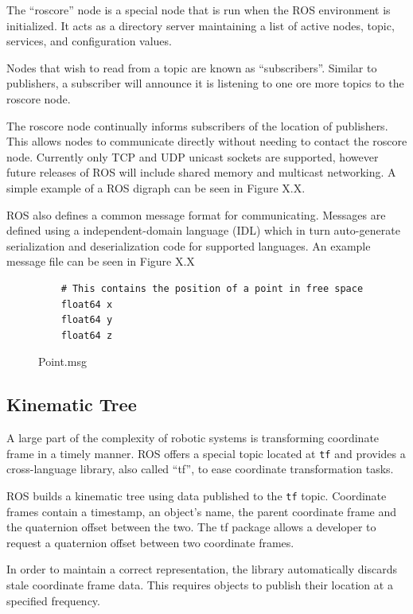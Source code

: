 The ``roscore'' node is a special node that is run when the ROS environment is initialized. It acts as a directory server maintaining a list of active nodes, topic, services, and configuration values.

Nodes that wish to read from a topic are known as ``subscribers''. Similar to publishers, a subscriber will announce it is listening to one ore more topics to the roscore node.

The roscore node continually informs subscribers of the location of publishers. This allows nodes to communicate directly without needing to contact the roscore node. Currently only TCP and UDP unicast sockets are supported, however future releases of ROS will include shared memory and multicast networking. A simple example of a ROS digraph can be seen in Figure X.X.

ROS also defines a common message format for communicating. Messages are defined using a independent-domain language (IDL) which in turn auto-generate serialization and deserialization code for supported languages. An example message file can be seen in Figure X.X

\begin{figure}[ht]
\makebox[\textwidth]{\hrulefill}
\begin{verbatim}
	# This contains the position of a point in free space
	float64 x
	float64 y
	float64 z
\end{verbatim}
\makebox[\textwidth]{\hrulefill}
\caption{Point.msg}
\end{figure}

\subsection{Kinematic Tree}
A large part of the complexity of robotic systems is transforming coordinate frame in a timely manner. ROS offers a special topic located at \verb!tf! and provides a cross-language library, also called ``tf'', to ease coordinate transformation tasks.

ROS builds a kinematic tree using data published to the \verb!tf! topic. Coordinate frames contain a timestamp, an object's name, the parent coordinate frame and the quaternion offset between the two. The tf package allows a developer to request a quaternion offset between two coordinate frames. 

In order to maintain a correct representation, the library automatically discards stale coordinate frame data. This requires objects to publish their location at a specified frequency. 

